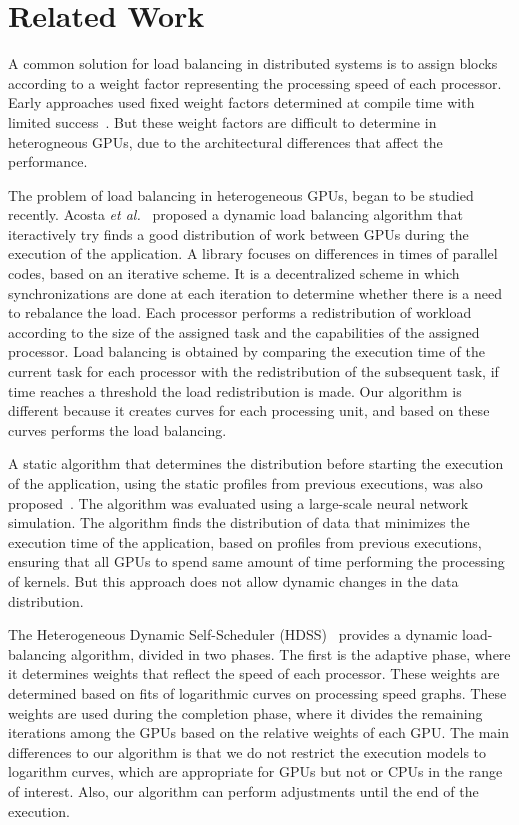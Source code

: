 \documentclass[journal]{IEEEtran}
\begin{document}

\section{Related Work}

A common solution for load balancing in distributed systems is to assign blocks
according to a weight factor representing the processing speed of each
processor. Early approaches used fixed weight factors determined at compile time
with limited success~\cite{Hummel}. But these weight factors are difficult to
determine in heterogneous GPUs, due to the architectural differences that affect
the performance.

The problem of load balancing in heterogeneous GPUs, began to be studied
recently. Acosta \emph{et al.}~\cite{acosta} proposed a dynamic load balancing
algorithm that iteractively try finds a good distribution of work between GPUs
during the execution of the application. A library focuses on differences in
times of parallel codes, based on an iterative scheme. It is a decentralized
scheme in which synchronizations are done at each iteration to determine whether
there is a need to rebalance the load. Each processor performs a redistribution
of workload according to the size of the assigned task and the capabilities of
the assigned processor. Load balancing is obtained by comparing the execution
time of the current task for each processor with the redistribution of the
subsequent task, if time reaches a threshold the load redistribution is
made. Our algorithm is different because it creates curves for each processing
unit, and based on these curves performs the load balancing.


A static algorithm that determines the distribution before starting the
execution of the application, using the static profiles from previous
executions, was also proposed~\cite{raphael}. The algorithm was evaluated using
a large-scale neural network simulation. The algorithm finds the distribution of
data that minimizes the execution time of the application, based on profiles
from previous executions, ensuring that all GPUs to spend same amount of time
performing the processing of kernels. But this approach does not allow dynamic
changes in the data distribution.

The Heterogeneous Dynamic Self-Scheduler (HDSS)~\cite{HDSS} provides a dynamic
load-balancing algorithm, divided in two phases. The first is the adaptive
phase, where it determines weights that reflect the speed of each processor.
These weights are determined based on fits of logarithmic curves on processing
speed graphs. These weights are used during the completion phase, where it
divides the remaining iterations among the GPUs based on the relative weights of
each GPU. The main differences to our algorithm is that we do not restrict the
execution models to logarithm curves, which are appropriate for GPUs but not or
CPUs in the range of interest. Also, our algorithm can perform adjustments until
the end of the execution.
\end{document}
